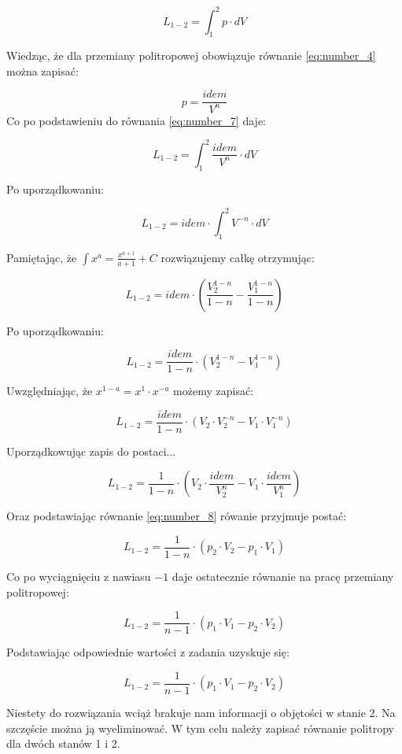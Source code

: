 \begin{equation}
L_{1-2} = \int_1^2 p\cdot dV
\label{eq:number_7}
\end{equation}


Wiedząc, że dla przemiany politropowej obowiązuje równanie \eqref{eq:number_4} można zapisać:

\begin{equation}
p = \frac{idem}{V^n}
\label{eq:number_8}
\end{equation}
Co po podstawieniu do równania \eqref{eq:number_7} daje:

\[L_{1-2} = \int_1^2 {\frac{idem}{V^n} \cdot dV} \]

Po uporządkowaniu:

\[L_{1-2} = idem \cdot \int_1^2 V^{-n} \cdot dV \]

Pamiętając, że $\int x^a = \frac{x^{a+1}}{a+1} + C$ rozwiązujemy całkę otrzymując:

\[L_{1-2} = idem \cdot \left( \frac{V_2 ^{1-n}}{1-n} - \frac{V_1 ^{1-n}}{1-n} \right)\]

Po uporządkowaniu:

\[L_{1-2} = \frac{idem}{1-n} \cdot \left( V_2 ^{1-n} - V_1 ^{1-n} \right)\]

Uwzględniając, że $x^{1-a} = x^1 \cdot x^{-a}$ możemy zapisać:

\[L_{1-2} = \frac{idem}{1-n} \cdot \left( V_2 \cdot V_2^{-n} - V_1 \cdot V_1^{-n} \right)\]

Uporządkowując zapis do postaci...

\[L_{1-2} = \frac{1}{1-n} \cdot \left( V_2 \cdot \frac {idem}{V_2^{n}} - V_1 \cdot \frac{idem}{V_1^{n}} \right)\]

Oraz podstawiając równanie \eqref{eq:number_8} rówanie przyjmuje postać:

\[L_{1-2} = \frac{1}{1-n} \cdot \left( p_2 \cdot V_2 - p_1 \cdot V_1 \right)\]

Co po wyciągnięciu z nawiasu $-1$ daje ostatecznie równanie na pracę przemiany politropowej:

\[L_{1-2} = \frac{1}{n-1} \cdot \left( p_1 \cdot V_1 - p_2 \cdot V_2 \right)\]

Podstawiając odpowiednie wartości z zadania uzyskuje się:

\[L_{1-2} = \frac{1}{n-1} \cdot \left( p_1 \cdot V_1 - p_2 \cdot V_2 \right)\]

Niestety do rozwiązania wciąż brakuje nam informacji o objętości w stanie 2. Na szczęście można ją wyeliminować. W tym celu należy zapisać równanie politropy dla dwóch stanów 1 i 2. 

